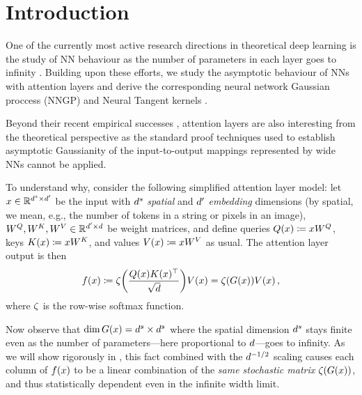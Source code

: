 \documentclass{article}
\begin{document}
\section{Introduction}\label{sect:intro}


One of the currently most active research directions in theoretical deep learning is the study of NN behaviour as the number of parameters in each layer goes to infinity \citep[e.g.,][]{matthews2018gaussian,lee2018deep,garriga2019deep,novak2019bayesian,li2018learning,allenzhu19convergence,du2019gd,arora2019,yang2019v2}. 
Building upon these efforts, we study the asymptotic behaviour of NNs with attention layers \citep{bahdanu2015nmt,vaswani2017attention} and derive the corresponding neural network Gaussian proccess (NNGP) and Neural Tangent kernels \citep[NTK,][]{jacot2018ntk,lee2019wide}.

Beyond their recent empirical successes \citep[e.g.,][]{radford2019language,devlin2019bert}, attention layers are also interesting from the theoretical perspective as the standard proof techniques used to establish asymptotic Gaussianity of the input-to-output mappings represented by wide NNs \citep{matthews2018gaussian,yang2019v2} cannot be applied. 

To understand why, consider the following simplified attention layer model: let $x \in \mathbb{R}^{d^s \times d'}$ be the input with $d^s$ \emph{spatial} and $d'$ \emph{embedding} dimensions (by spatial, we mean, e.g., the number of tokens in a string or pixels in an image),  
$W^{Q}, W^{K}, W^{V} \in \mathbb{R}^{d' \times d}$ be weight matrices, and define queries
$Q(x) \coloneqq x W^{Q}$, keys $K(x) \coloneqq x W^{K}$, and values $V(x) \coloneqq x W^{V}$ as usual.
The attention layer output is then
\begin{align}\label{eq:single_head_informal}
    f(x)
    \coloneqq
    \zeta \biggl(
        \frac{
            Q(x) K(x)^\top
        }{\sqrt{d}}
    \biggr) 
    V(x)
    =
    \zeta (
        G(x)
    )
    V(x)
    \, ,
\end{align}
where $\zeta$ is the row-wise softmax function.

Now observe that 
$\dim G(x) = d^s \times d^s$ 
where the spatial dimension $d^s$ stays finite even as the number of parameters---here proportional to $d$---goes to infinity.
As we will show rigorously in , this fact combined with the $d^{-1/2}$ scaling 
causes each column of $f(x)$ to be a linear combination of the \emph{same stochastic matrix} $\zeta(G(x))$, and thus statistically dependent even in the infinite width limit.
\end{document}

